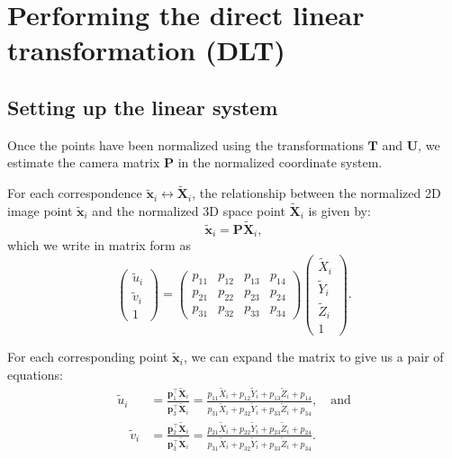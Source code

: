 \documentclass[12pt]{article}
\begin{document}
\section{Performing the direct linear transformation (DLT)}

\subsection{Setting up the linear system}

Once the points have been normalized using the transformations $ \mathbf{T} $ and $ \mathbf{U} $, we estimate the camera matrix $ \mathbf{P} $ in the normalized coordinate system. 

For each correspondence $ \tilde{\mathbf{x}}_i \leftrightarrow \tilde{\mathbf{X}}_i $, the relationship between the normalized 2D image point $ \tilde{\mathbf{x}}_i $ and the normalized 3D space point $ \tilde{\mathbf{X}}_i $ is given by:
$$
\tilde{\mathbf{x}}_i = \mathbf{P} \tilde{\mathbf{X}}_i,
$$
which we write in matrix form as
$$
\begin{pmatrix} 
    \tilde{u}_i \\ \tilde{v}_i \\ 1
\end{pmatrix} = 
\begin{pmatrix} 
p_{11} & p_{12} & p_{13} & p_{14} \\
p_{21} & p_{22} & p_{23} & p_{24} \\
p_{31} & p_{32} & p_{33} & p_{34} 
\end{pmatrix}
\begin{pmatrix} 
\tilde{X}_i \\ \tilde{Y}_i \\ \tilde{Z}_i \\ 1
\end{pmatrix}.
$$

For each corresponding point $\tilde{\mathbf{x}}_i$, we can expand the matrix to give us a pair of equations:
\begin{align*}
\tilde{u}_i &= \frac{\mathbf{p}_1^\top \tilde{\mathbf{X}}_i}{\mathbf{p}_3^\top \tilde{\mathbf{X}}_i}
= \frac{p_{11} \tilde{X}_i + p_{12} \tilde{Y}_i + p_{13} \tilde{Z}_i + p_{14}}{p_{31} \tilde{X}_i + p_{32} \tilde{Y}_i + p_{33} \tilde{Z}_i + p_{34}},\quad\text{and}
\\
\quad \tilde{v}_i &= \frac{\mathbf{p}_2^\top \tilde{\mathbf{X}}_i}{\mathbf{p}_3^\top \tilde{\mathbf{X}}_i}
= \frac{p_{21} \tilde{X}_i + p_{22} \tilde{Y}_i + p_{23} \tilde{Z}_i + p_{24}}{p_{31} \tilde{X}_i + p_{32} \tilde{Y}_i + p_{33} \tilde{Z}_i + p_{34}}.
\end{align*}
\end{document}
